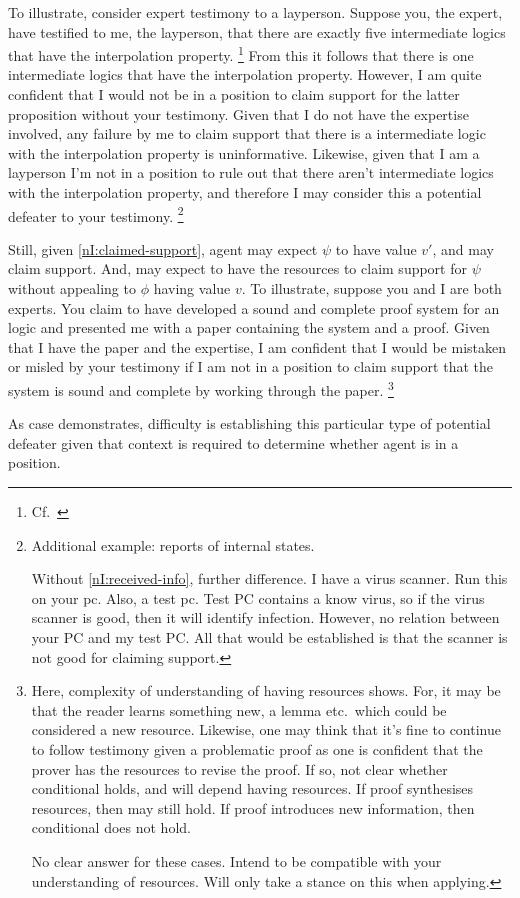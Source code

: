 \begin{note}
  To illustrate, consider expert testimony to a layperson.
  Suppose you, the expert, have testified to me, the layperson, that there are exactly five intermediate logics that have the interpolation property.\nolinebreak
  \footnote{Cf.\ \textcite{Maksimova:1977un}}
  From this it follows that there is one intermediate logics that have the interpolation property.
  However, I am quite confident that I would not be in a position to claim support for the latter proposition without your testimony.
  Given that I do not have the expertise involved, any failure by me to claim support that there is a intermediate logic with the interpolation property is uninformative.
  Likewise, given that I am a layperson I'm not in a position to rule out that there aren't intermediate logics with the interpolation property, and therefore I may consider this a potential defeater to your testimony.\nolinebreak
  \footnote{
    Additional example: reports of internal states.

    Without \ref{nI:received-info}, further difference.
    I have a virus scanner.
    Run this on your pc.
    Also, a test pc.
    Test PC contains a know virus, so if the virus scanner is good, then it will identify infection.
    However, no relation between your PC and my test PC.
    All that would be established is that the scanner is not good for claiming support.
    }

  Still, given \ref{nI:claimed-support}, agent may expect \(\psi\) to have value \(v'\), and may claim support.
  And, may expect to have the resources to claim support for \(\psi\) without appealing to \(\phi\) having value \(v\).
  To illustrate, suppose you and I are both experts.
  You claim to have developed a sound and complete proof system for an logic and presented me with a paper containing the system and a proof.
  Given that I have the paper and the expertise, I am confident that I would be mistaken or misled by your testimony if I am not in a position to claim support that the system is sound and complete by working through the paper.\nolinebreak
  \footnote{
    Here, complexity of understanding of having resources shows.
    For, it may be that the reader learns something new, a lemma etc.\ which could be considered a new resource.
    Likewise, one may think that it's fine to continue to follow testimony given a problematic proof as one is confident that the prover has the resources to revise the proof.
    If so, not clear whether conditional holds, and will depend having resources.
    If proof synthesises resources, then may still hold.
    If proof introduces new information, then conditional does not hold.

    No clear answer for these cases.
    Intend to be compatible with your understanding of resources.
    Will only take a stance on this when applying.
  }

  As case demonstrates, difficulty is establishing this particular type of potential defeater given that context is required to determine whether agent is in a position.
\end{note}

